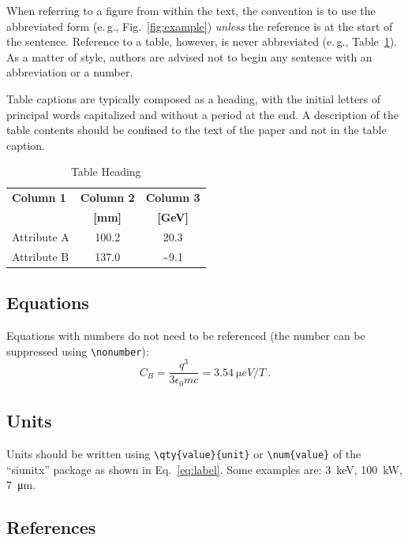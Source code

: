 \documentclass[%
               ]{jacow}
\begin{document}
When referring to a figure from within the text, the
convention is to use the abbreviated form (e.\,g., Fig.~\ref{fig:example})
\emph{unless} the reference is at the start of the sentence. Reference to a
table, however, is never abbreviated (e.\,g., Table~\ref{tab:example}).
As a matter of style, authors are advised not to begin any sentence with an abbreviation or a number.

Table captions are typically composed as a heading, with the initial letters of principal words capitalized and without a period at the end. A description of the table contents should be confined to the text of the paper and not in the table caption. 
\begin{table}[!hbt]
   \centering
   \caption{Table Heading}
   \begin{tabular}{lcc}
       \toprule
       \textbf{Column 1} & \textbf{Column 2} & \textbf{Column 3} \\ 
                         & \textbf{[mm]}     & \textbf{[GeV]}	 \\
       \midrule
          Attribute A    & \num{100.2}       & \num{20.3}        \\
          Attribute B    & \num{137.0}       & \num{~9.1}        \\
       \bottomrule
   \end{tabular}
   \label{tab:example}
\end{table}

\subsection{Equations}

Equations with numbers do not need to be referenced (the number can be suppressed using \verb|\nonumber|):
\begin{equation}\label{eq:label}
    C_B=\frac{q^3}{3\epsilon_{0}mc} = \qty{3.54}{\micro eV/T}\ .
\end{equation}

\subsection{Units}

Units should be written using \verb|\qty{value}{unit}| or \verb|\num{value}| of the “siunitx” package as shown in Eq.~\eqref{eq:label}. Some examples are: \qty{3}{keV}, \qty{100}{kW}, \qty{7}{\um}.

\subsection{References}
\end{document}
